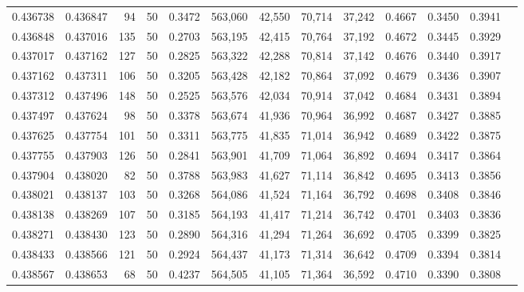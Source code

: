 \begin{tabular}{rrrrrrrrrrrrr}
0.436738 & 0.436847 &    94 &  50 &                                     0.3472 & 563,060 &  42,550 &  70,714 &  37,242 & 0.4667 & 0.3450 & 0.3941 \\
0.436848 & 0.437016 &   135 &  50 &                                     0.2703 & 563,195 &  42,415 &  70,764 &  37,192 & 0.4672 & 0.3445 & 0.3929 \\
0.437017 & 0.437162 &   127 &  50 &                                     0.2825 & 563,322 &  42,288 &  70,814 &  37,142 & 0.4676 & 0.3440 & 0.3917 \\
0.437162 & 0.437311 &   106 &  50 &                                     0.3205 & 563,428 &  42,182 &  70,864 &  37,092 & 0.4679 & 0.3436 & 0.3907 \\
0.437312 & 0.437496 &   148 &  50 &                                     0.2525 & 563,576 &  42,034 &  70,914 &  37,042 & 0.4684 & 0.3431 & 0.3894 \\
0.437497 & 0.437624 &    98 &  50 &                                     0.3378 & 563,674 &  41,936 &  70,964 &  36,992 & 0.4687 & 0.3427 & 0.3885 \\
0.437625 & 0.437754 &   101 &  50 &                                     0.3311 & 563,775 &  41,835 &  71,014 &  36,942 & 0.4689 & 0.3422 & 0.3875 \\
0.437755 & 0.437903 &   126 &  50 &                                     0.2841 & 563,901 &  41,709 &  71,064 &  36,892 & 0.4694 & 0.3417 & 0.3864 \\
0.437904 & 0.438020 &    82 &  50 &                                     0.3788 & 563,983 &  41,627 &  71,114 &  36,842 & 0.4695 & 0.3413 & 0.3856 \\
0.438021 & 0.438137 &   103 &  50 &                                     0.3268 & 564,086 &  41,524 &  71,164 &  36,792 & 0.4698 & 0.3408 & 0.3846 \\
0.438138 & 0.438269 &   107 &  50 &                                     0.3185 & 564,193 &  41,417 &  71,214 &  36,742 & 0.4701 & 0.3403 & 0.3836 \\
0.438271 & 0.438430 &   123 &  50 &                                     0.2890 & 564,316 &  41,294 &  71,264 &  36,692 & 0.4705 & 0.3399 & 0.3825 \\
0.438433 & 0.438566 &   121 &  50 &                                     0.2924 & 564,437 &  41,173 &  71,314 &  36,642 & 0.4709 & 0.3394 & 0.3814 \\
0.438567 & 0.438653 &    68 &  50 &                                     0.4237 & 564,505 &  41,105 &  71,364 &  36,592 & 0.4710 & 0.3390 & 0.3808 \\

\end{tabular}
